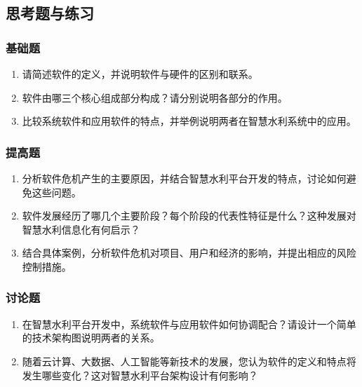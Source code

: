 \hypertarget{ux601dux8003ux9898ux4e0eux7ec3ux4e60}{%
\subsection{思考题与练习}\label{ux601dux8003ux9898ux4e0eux7ec3ux4e60}}

\hypertarget{ux57faux7840ux9898}{%
\subsubsection{基础题}\label{ux57faux7840ux9898}}

\begin{enumerate}
\def\labelenumi{\arabic{enumi}.}
\tightlist
\item
  请简述软件的定义，并说明软件与硬件的区别和联系。
\item
  软件由哪三个核心组成部分构成？请分别说明各部分的作用。
\item
  比较系统软件和应用软件的特点，并举例说明两者在智慧水利系统中的应用。
\end{enumerate}

\hypertarget{ux63d0ux9ad8ux9898}{%
\subsubsection{提高题}\label{ux63d0ux9ad8ux9898}}

\begin{enumerate}
\def\labelenumi{\arabic{enumi}.}
\tightlist
\item
  分析软件危机产生的主要原因，并结合智慧水利平台开发的特点，讨论如何避免这些问题。
\item
  软件发展经历了哪几个主要阶段？每个阶段的代表性特征是什么？这种发展对智慧水利信息化有何启示？
\item
  结合具体案例，分析软件危机对项目、用户和经济的影响，并提出相应的风险控制措施。
\end{enumerate}

\hypertarget{ux8ba8ux8bbaux9898}{%
\subsubsection{讨论题}\label{ux8ba8ux8bbaux9898}}

\begin{enumerate}
\def\labelenumi{\arabic{enumi}.}
\tightlist
\item
  在智慧水利平台开发中，系统软件与应用软件如何协调配合？请设计一个简单的技术架构图说明两者的关系。
\item
  随着云计算、大数据、人工智能等新技术的发展，您认为软件的定义和特点将发生哪些变化？这对智慧水利平台架构设计有何影响？
\end{enumerate}

